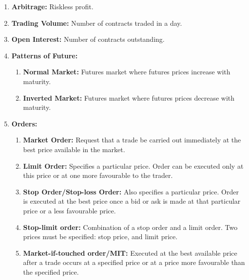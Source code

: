 \begin{enumerate}


    \item \textbf{Arbitrage:} Riskless profit.
    \item \textbf{Trading Volume:} Number of contracts traded in a day.
    \item \textbf{Open Interest:} Number of contracts outstanding.
    \item \textbf{Patterns of Future:}
    \begin{enumerate}
        \item \textbf{Normal Market:} Futures market where futures prices increase with maturity.
        \item \textbf{Inverted Market:} Futures market where futures prices decrease with maturity.
    \end{enumerate}
    \item \textbf{Orders:}
    \begin{enumerate}
        \item \textbf{Market Order:} Request that a trade be carried out immediately at the best price available in the market.
        \item \textbf{Limit Order:} Specifies a particular price. Order can be executed only at this price or at one more favourable to the trader.
        \item \textbf{Stop Order/Stop-loss Order:} Also specifies a particular price. Order is executed at the best price once a bid or ask is made at that particular price or a less favourable price.
        \item \textbf{Stop-limit order:} Combination of a stop order and a limit order. Two prices must be specified: stop price, and limit price.
        \item \textbf{Market-if-touched order/MIT:} Executed at the best available price after a trade occurs at a specified price or at a price more favourable than the specified price.

\end{enumerate}
\end{enumerate}
